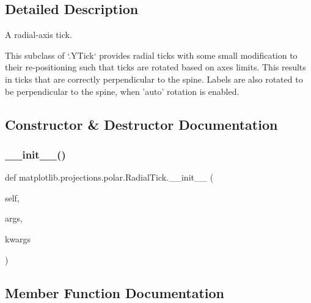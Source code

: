 \subsection{Detailed Description}
\begin{DoxyVerb}A radial-axis tick.

This subclass of `.YTick` provides radial ticks with some small
modification to their re-positioning such that ticks are rotated based on
axes limits.  This results in ticks that are correctly perpendicular to
the spine. Labels are also rotated to be perpendicular to the spine, when
'auto' rotation is enabled.
\end{DoxyVerb}
 

\subsection{Constructor \& Destructor Documentation}
\mbox{\label{classmatplotlib_1_1projections_1_1polar_1_1RadialTick_ac998797a93e328bd28a5f4677a8855c5}} 
\subsubsection{\texorpdfstring{\+\_\+\+\_\+init\+\_\+\+\_\+()}{\_\_init\_\_()}}
{\footnotesize\ttfamily def matplotlib.\+projections.\+polar.\+Radial\+Tick.\+\_\+\+\_\+init\+\_\+\+\_\+ (\begin{DoxyParamCaption}\item[{}]{self,  }\item[{}]{args,  }\item[{}]{kwargs }\end{DoxyParamCaption})}



\subsection{Member Function Documentation}
\mbox{\label{classmatplotlib_1_1projections_1_1polar_1_1RadialTick_a74569625df860499b06130547f59b80b}} 
